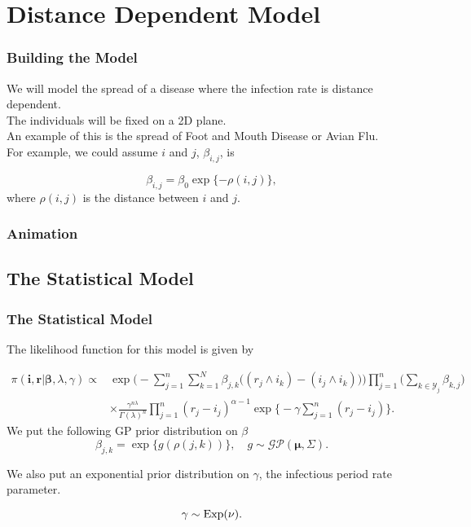 \documentclass[demo]{beamer}
\begin{document}
\section{Distance Dependent Model}
\begin{frame}
	\frametitle{Building the Model}
	We will model the spread of a disease where the infection rate is distance dependent. \\
	\vspace{5mm}
	The individuals will be fixed on a 2D plane. \\
	\vspace{5mm}
	An example of this is the spread of Foot and Mouth Disease or Avian Flu.\\
	\pause
	\vspace{5mm}
	For example, we could assume $i$ and $j$, $\beta_{i,j}$, is
	
	$$
	\beta_{i, j} = \beta_0\exp\{-\rho(i, j)\},
	$$
	where $\rho(i, j)$ is the distance between $i$ and $j$.
\end{frame}

\begin{frame}
	\frametitle{Animation}
	\centering
\end{frame}

\subsection{The Statistical Model}
\begin{frame}
	\frametitle{The Statistical Model}
The likelihood function for this model is given by
	
\begin{align*}
\pi(\textbf{i}, \textbf{r}| \boldsymbol{\beta}, \lambda, \gamma) \propto &\exp\Big(- \sum\limits_{j=1}^n\sum\limits_{k=1}^N \beta_{j, k}\big((r_j \wedge i_k) - (i_j \wedge i_k)\big)\Big)\prod\limits_{j=1}^n\Big(\sum\limits_{k \in \mathcal{Y}_j} \beta_{k, j}\Big)  \\ 
&\times \frac{\gamma^{n\lambda}}{\Gamma(\lambda)^n}\prod\limits_{j=1}^n(r_j-i_j)^{\alpha-1}\exp\Big\{-\gamma\sum\limits_{j=1}^n (r_j-i_j)\Big\}. 
\end{align*}
We put the following GP prior distribution on $\beta$
$$
 \beta_{j, k} = \exp\big\{g(\rho(j, k))\big\}, \quad g \sim \mathcal{GP}(\boldsymbol{\mu}, \Sigma).
$$

We also put an exponential prior distribution on $\gamma$, the infectious period rate parameter. 

$$
\gamma \sim \hbox{Exp}(\nu).
$$
\nocite{Theo07}


\end{frame}
\end{document}
